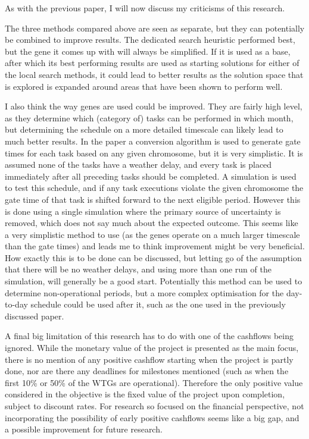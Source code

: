 \documentclass[a4paper,12pt]{article}
\begin{document}
\bigskip

As with the previous paper, I will now discuss my criticisms of this research. 

The three methods compared above are seen as separate, but they can potentially be combined to improve results. The dedicated search heuristic performed best, but the gene it comes up with will always be simplified. If it is used as a base, after which its best performing results are used as starting solutions for either of the local search methods, it could lead to better results as the solution space that is explored is expanded around areas that have been shown to perform well. 

I also think the way genes are used could be improved. They are fairly high level, as they determine which (category of) tasks can be performed in which month, but determining the schedule on a more detailed timescale can likely lead to much better results. In the paper a conversion algorithm is used to generate gate times for each task based on any given chromosome, but it is very simplistic. It is assumed none of the tasks have a weather delay, and every task is placed immediately after all preceding tasks should be completed. A simulation is used to test this schedule, and if any task executions violate the given chromosome the gate time of that task is shifted forward to the next eligible period. However this is done using a single simulation where the primary source of uncertainty is removed, which does not say much about the expected outcome. This seems like a very simplistic method to use (as the genes operate on a much larger timescale than the gate times) and leads me to think improvement might be very beneficial. How exactly this is to be done can be discussed, but letting go of the assumption that there will be no weather delays, and using more than one run of the simulation, will generally be a good start. Potentially this method can be used to determine non-operational periods, but a more complex optimisation for the day-to-day schedule could be used after it, such as the one used in the previously discussed paper. 

A final big limitation of this research has to do with one of the cashflows being ignored. While the monetary value of the project is presented as the main focus, there is no mention of any positive cashflow starting when the project is partly done, nor are there any deadlines for milestones mentioned (such as when the first 10\% or 50\% of the WTGs are operational). Therefore the only positive value considered in the objective is the fixed value of the project upon completion, subject to discount rates. For research so focused on the financial perspective, not incorporating the possibility of early positive cashflows seems like a big gap, and a possible improvement for future research.
\end{document}
